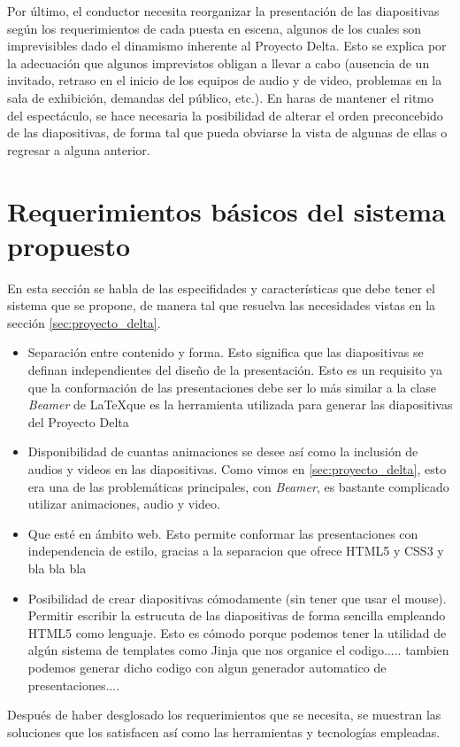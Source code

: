 			Por último, el conductor necesita reorganizar la presentación de las diapositivas según los requerimientos de cada puesta en escena, algunos de los cuales son imprevisibles dado el dinamismo inherente al Proyecto Delta. Esto se explica por la adecuación que algunos imprevistos obligan a llevar a cabo (ausencia de un invitado, retraso en el inicio de los equipos de audio y de video, problemas en la sala de exhibición, demandas del público, etc.). En haras de mantener el ritmo del espectáculo, se hace necesaria la posibilidad de alterar el orden preconcebido de las diapositivas, de forma tal que pueda obviarse la vista de algunas de ellas o regresar a alguna anterior.			


	\section{Requerimientos básicos del sistema propuesto} %
	\label{sec:requerimientos_basicos_del_sistema_propuesto}
		En esta sección se habla de las especifidades y características que debe tener el sistema que se propone, de manera tal que resuelva las necesidades vistas en la sección \ref{sec:proyecto_delta}.
		\begin{itemize}
				\item Separación entre contenido y forma. Esto significa que las diapositivas se definan independientes del diseño de la presentación. Esto es un requisito ya que la conformación de las presentaciones debe ser lo más similar a la clase \textit{Beamer} de \LaTeX que es la herramienta utilizada para generar las diapositivas del Proyecto Delta
				\item Disponibilidad de cuantas animaciones se desee así como la inclusión de audios y videos en las diapositivas. Como vimos en \ref{sec:proyecto_delta}, esto era una de las problemáticas principales, con \textit{Beamer}, es bastante complicado utilizar animaciones, audio y video.
				\item Que esté en ámbito web. Esto permite conformar las presentaciones con independencia de estilo, gracias a la separacion que ofrece HTML5 y CSS3 y bla bla bla
				\item Posibilidad de crear diapositivas cómodamente (sin tener que usar el mouse). Permitir escribir la estrucuta de las diapositivas de forma sencilla empleando HTML5 como lenguaje. Esto es cómodo porque podemos tener la utilidad de algún sistema de templates como Jinja que nos organice el codigo..... tambien podemos generar dicho codigo con algun generador automatico de presentaciones....
		\end{itemize}	
	Después de haber desglosado los requerimientos que se necesita, se muestran las soluciones que los satisfacen así como las herramientas y tecnologías empleadas. 

